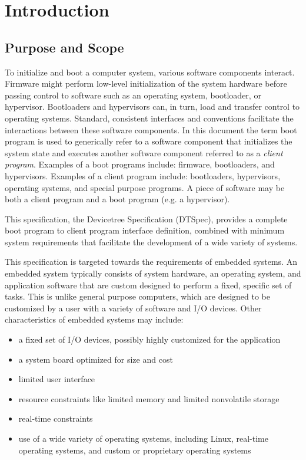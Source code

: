 \documentclass[a4paper,10pt,oneside]{sphinxmanual}
\begin{document}
\chapter{Introduction}
\label{introduction:chapter-introduction}\label{introduction:introduction}\label{introduction::doc}\label{introduction:welcome-to-devicetree-specification-s-documentation}

\section{Purpose and Scope}
\label{introduction:purpose-and-scope}
To initialize and boot a computer system, various software components
interact. Firmware might perform low-level initialization of the system
hardware before passing control to software such as an operating system,
bootloader, or hypervisor. Bootloaders and hypervisors can, in turn,
load and transfer control to operating systems. Standard, consistent
interfaces and conventions facilitate the interactions between these
software components.  In this document the term boot program is used to
generically refer to a software component that initializes the system
state and executes another software component referred to as a \emph{client
program}. Examples of a boot programs include: firmware, bootloaders, and
hypervisors. Examples of a client program include: bootloaders,
hypervisors, operating systems, and special purpose programs. A piece of
software may be both a client program and a boot program  (e.g. a hypervisor).

This specification, the Devicetree Specification (DTSpec),
provides a complete boot program to client program
interface definition, combined with minimum system requirements that
facilitate the development of a wide variety of systems.

This specification is targeted towards the requirements of embedded
systems. An embedded system typically consists of system hardware, an
operating system, and application software that are custom designed to
perform a fixed, specific set of tasks. This is unlike general purpose
computers, which are designed to be customized by a user with a variety
of software and I/O devices. Other characteristics of embedded systems
may include:
\begin{itemize}
\item {} 
a fixed set of I/O devices, possibly highly customized for the
application

\item {} 
a system board optimized for size and cost

\item {} 
limited user interface

\item {} 
resource constraints like limited memory and limited nonvolatile storage

\item {} 
real-time constraints

\item {} 
use of a wide variety of operating systems, including Linux,
real-time operating systems, and custom or proprietary operating
systems

\end{itemize}
\end{document}
